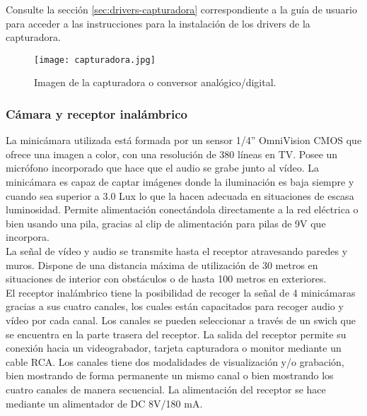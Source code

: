 Consulte la sección \ref{sec:drivers-capturadora} correspondiente a la guía de usuario para acceder a las instrucciones para la instalación de los drivers de la capturadora.\\

\begin{figure}[H]
  \begin{center}
    \texttt{[image: capturadora.jpg]}
  \end{center}
  \caption{Imagen de la capturadora o conversor analógico/digital.}
  \label{fig:capturadora}
\end{figure}

\subsubsection{Cámara y receptor inalámbrico} 

La minicámara utilizada está formada por un sensor 1/4'' OmniVision CMOS que ofrece una imagen a color, con una resolución de 380 líneas en TV. Posee un micrófono incorporado que hace que el audio se grabe junto al vídeo. La minicámara es capaz de captar imágenes donde la iluminación es baja siempre y cuando sea superior a 3.0 Lux lo que la hacen adecuada en situaciones de escasa luminosidad. Permite alimentación conectándola directamente a la red  eléctrica o bien usando una pila, gracias al clip de alimentación para pilas de 9V que incorpora.\\

La señal de vídeo y audio se transmite hasta el receptor atravesando paredes y muros. Dispone de una distancia máxima de utilización de 30 metros en situaciones de interior con obstáculos o de hasta 100 metros en exteriores.\\
 
El receptor inalámbrico tiene la posibilidad de recoger la señal de 4 minicámaras gracias a sus cuatro canales, los cuales están capacitados para recoger audio y vídeo por cada canal. Los canales se pueden seleccionar a través de un swich que se encuentra en la parte trasera del receptor. La salida del receptor permite su conexión hacia un videograbador, tarjeta capturadora o monitor mediante un cable RCA. Los canales tiene dos modalidades de visualización y/o grabación, bien mostrando de forma permanente un mismo canal o bien mostrando los cuatro canales de manera secuencial. La alimentación del receptor se hace mediante un alimentador de DC 8V/180 mA.\\

